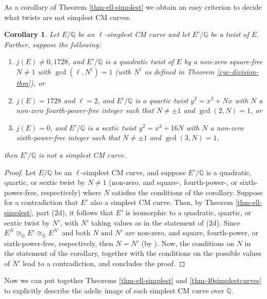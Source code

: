 \documentclass[11pt]{amsart}
\newtheorem{corollary}[defn]{Corollary}
\theoremstyle{definition}
\newcommand{\Q}{\mathbb{Q}}
\begin{document}
As a corollary of Theorem \ref{thm-ell-simplest} we obtain an easy criterion to decide what twists are not simplest CM curves.

\begin{corollary}\label{cor-notsimplest} Let $E/\Q$ be an $\ell$-simplest CM curve and let $E'/\Q$ be a twist of $E$. Further, suppose the following:
\begin{enumerate}
    \item  $j(E)\neq 0,1728$, and  $E'/\Q$ is a quadratic  twist of $E$ by a non-zero square-free $N\neq 1$ with $\gcd(\ell,N^\dagger)=1$ (with $N^\dagger$ as defined in Theorem \ref{cyc-division-thm}), or
    \item $j(E)=1728$ and $\ell=2$, and $E'/\Q$ is a quartic twist $y^2=x^3+Nx$ with $N$ a non-zero fourth-power-free integer such that $N\neq \pm 1$ and $\gcd(2,N)=1$, or
    \item $j(E)=0$, and $E'/\Q$ is a sextic twist $y^2=x^3 + 16N$ with $N$ a non-zero sixth-power-free integer such that  $N\neq \pm 1$ and $\gcd(3,N)=1$,
\end{enumerate}
then $E'/\Q$ is not a simplest CM curve.
\end{corollary}
\begin{proof}
Let $E/\Q$ be an $\ell$-simplest CM curve, and suppose $E'/\Q$ is a quadratic, quartic, or sextic twist by $N\neq 1$ (non-zero, and square-, fourth-power-, or sixth-power-free, respectively) where $N$ satisfies the conditions of the corollary. Suppose for a contradiction that $E'$ also a simplest CM curve. Then, by Theorem \ref{thm-ell-simplest}, part (2d), it follows that $E'$ is isomorphic to  a quadratic, quartic, or sextic twist by $N'$, with $N'$ taking values as in the statement of (2d). Since $E^N \cong_\Q E' \cong_\Q E^{N'}$ and both $N$ and $N'$ are non-zero, and square, fourth-power, or sixth-power-free, respectively, then $N=N'$ (by \cite[Ch. X, Prop. 5.4, and Cor. 5.4.1]{silverman1}). Now, the conditions on $N$ in the statement of the corollary, together with the conditions on the possible values of $N'$ lead to a contradiction, and concludes the proof.
\end{proof}

Now we can put together Theorems \ref{thm-ell-simplest} and \ref{thm-40simplestcurves}  to explicitly describe the adelic image of each simplest CM curve over $\Q$.
\end{document}
